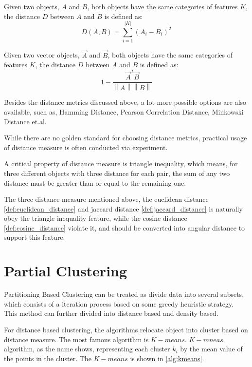 \documentclass[utf8,english]{gradu3}
\begin{document}
\begin{definition}
	\label{def:euclidean_distance}
	Given two objects, $A$ and $B$, both objects have the same categories of features $K$, the distance $D$ between $A$ and $B$ is defined as:
	\[
	D\left(A,B\right) =
	\sum\limits_{i=1}^{\lvert  K\rvert } \left( 
		A_i - B_i
		\right)^2
\]
\end{definition}

\begin{definition}
	\label{def:cosine_distance}
	Given two vector objects, $ \overrightarrow{A}$ and $\overrightarrow{B}$, both objects have the same categories of features $K$, the distance $D$ between $A$ and $B$ is defined as:
	\[
	1- \frac{ \overrightarrow{A}^T \overrightarrow{B} }{\left \| A \right \| \left \| B \right \|}
	\]
\end{definition}

Besides the distance metrics discussed above, a lot more possible options are also available, such as, Hamming Distance, Pearson Correlation Distance, Minkowski Distance et.al. 

While there are no golden standard for choosing distance metrics, practical usage of distance measure is often conducted via experiment.

A critical property of distance measure is triangle inequality, which means, for three different objects with three distance for each pair, the sum of any two distance must be greater than or equal to the remaining one.

The three distance measure mentioned above, the euclidean distance \ref{def:euclidean_distance} and jaccard distance \ref*{def:jaccard_distance} is naturally obey the triangle inequality feature, while the cosine distance \ref*{def:cosine_distance} violate it, and should be converted into angular distance to support this feature.


\section{Partial Clustering}

Partitioning Based Clustering can be treated as divide data into several subsets, which consists of a iteration process based on some greedy heuristic strategy. This method can further divided into distance based and density based.

For distance based clustering, the algorithms relocate object into cluster based on distance measure. The most famous algorithm is $K-means$. $K-mneas$ algorithm, as the name shows, representing each cluster $k_i$ by the mean value of the points in the cluster. The $K-means$ is shown in \ref*{alg:kmeans}.
\end{document}
